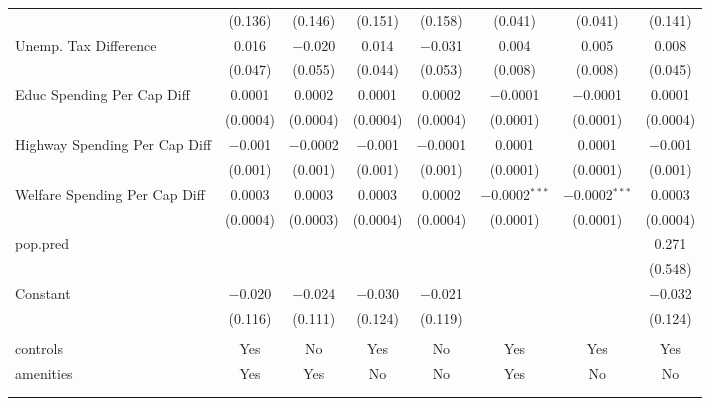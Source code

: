 \begin{table}[!htbp]
\begin{tabular}{@{\extracolsep{5pt}}lccccccc}
  & (0.136) & (0.146) & (0.151) & (0.158) & (0.041) & (0.041) & (0.141) \\ 
  Unemp. Tax Difference & 0.016 & $-$0.020 & 0.014 & $-$0.031 & 0.004 & 0.005 & 0.008 \\ 
  & (0.047) & (0.055) & (0.044) & (0.053) & (0.008) & (0.008) & (0.045) \\ 
  Educ Spending Per Cap Diff & 0.0001 & 0.0002 & 0.0001 & 0.0002 & $-$0.0001 & $-$0.0001 & 0.0001 \\ 
  & (0.0004) & (0.0004) & (0.0004) & (0.0004) & (0.0001) & (0.0001) & (0.0004) \\ 
  Highway Spending Per Cap Diff & $-$0.001 & $-$0.0002 & $-$0.001 & $-$0.0001 & 0.0001 & 0.0001 & $-$0.001 \\ 
  & (0.001) & (0.001) & (0.001) & (0.001) & (0.0001) & (0.0001) & (0.001) \\ 
  Welfare Spending Per Cap Diff & 0.0003 & 0.0003 & 0.0003 & 0.0002 & $-$0.0002$^{***}$ & $-$0.0002$^{***}$ & 0.0003 \\ 
  & (0.0004) & (0.0003) & (0.0004) & (0.0004) & (0.0001) & (0.0001) & (0.0004) \\ 
  pop.pred &  &  &  &  &  &  & 0.271 \\ 
  &  &  &  &  &  &  & (0.548) \\ 
  Constant & $-$0.020 & $-$0.024 & $-$0.030 & $-$0.021 &  &  & $-$0.032 \\ 
  & (0.116) & (0.111) & (0.124) & (0.119) &  &  & (0.124) \\ 
 \hline \\[-1.8ex] 
controls & Yes & No & Yes & No & Yes & Yes & Yes \\ 
amenities & Yes & Yes & No & No & Yes & No & No \\ 
\hline \\[-1.8ex] 
\hline 
\hline \\[-1.8ex] 
\end{tabular} 
\end{table} 
